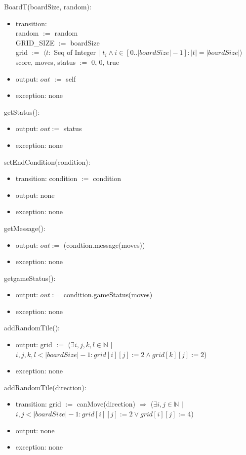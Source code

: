 \documentclass[12pt]{article}
\begin{document}
BoardT(boardSize, random):
\begin{itemize}
\item transition: \\
      random $:=$ random\\
      GRID\_SIZE $:=$ boardSize\\
      grid $:=$ $ \langle t :$ Seq of Integer $|$ $t_{i} \wedge i \in [0..|boardSize|-1] : |t| = |boardSize| \rangle $\\
      score, moves, status $:=$ 0, 0, true
\item output: $out$ $:=$ self
\item exception: none
\end{itemize}

\noindent getStatus():
\begin{itemize}
\item output: $out :=$ status
\item exception: none
\end{itemize}

\noindent setEndCondition(condition):
\begin{itemize}
\item transition: condition $:=$ condition
\item output: none 
\item exception: none
\end{itemize}

\noindent getMessage():
\begin{itemize}
\item output: $out :=$ (condtion.message(moves))
\item exception: none
\end{itemize}

\noindent getgameStatus():
\begin{itemize}
\item output: $out :=$ condition.gameStatus(moves)
\item exception: none
\end{itemize}

\noindent addRandomTile():
\begin{itemize}
\item output: grid $:=$ ($\exists i, j, k, l \in \mathbb{N}$ $|$ $i, j, k, l < |boardSize|-1 : grid[i][j] := 2 \wedge grid[k][j] := 2$)
\item exception: none
\end{itemize}

\noindent addRandomTile(direction):
\begin{itemize}
\item transition: grid $:=$ canMove(direction) $\Rightarrow$ ($\exists i, j \in \mathbb{N}$ $|$ $i, j < |boardSize|-1 : grid[i][j] := 2 \vee grid[i][j] := 4$)
\item output: none
\item exception: none
\end{itemize}
\end{document}
